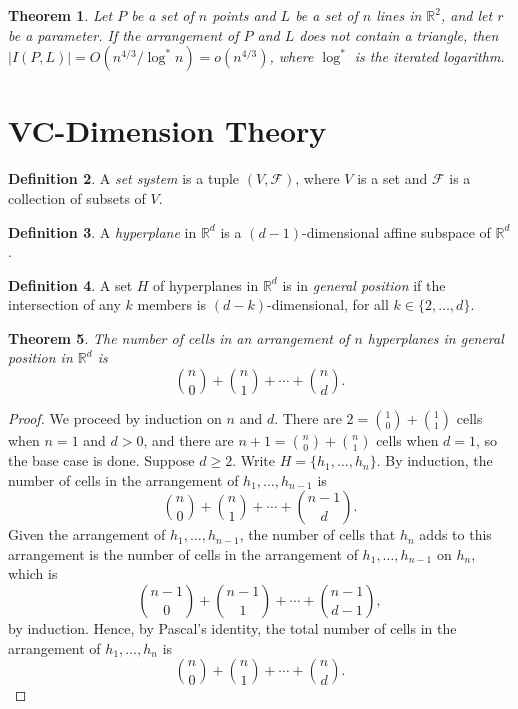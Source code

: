 \documentclass[12pt,reqno]{amsart}
\newtheorem{theorem}{Theorem}[section]
\theoremstyle{definition}
\newtheorem{definition}[theorem]{Definition}
\theoremstyle{remark}
\renewcommand{\geq}{\geqslant}
\def\F{\mathcal{F}}
\def\R{\mathbb{R}}
\numberwithin{equation}{section}
\begin{document}
\begin{theorem}
	Let $P$ be a set of $n$ points and $L$ be a set of $n$ lines in $\R^2$, and let $r$ be a parameter. If the arrangement of $P$ and $L$ does not contain a triangle, then $|I(P, L)| = O(n^{4/3}/\log^* n) = o(n^{4/3})$, where $\log^*$ is the iterated logarithm. 
\end{theorem}

\newpage

\section{VC-Dimension Theory}

\begin{definition}
	A \textit{set system} is a tuple $(V, \F)$, where $V$ is a set and $\F$ is a collection of subsets of $V$. 
\end{definition}

\begin{definition}
	A \textit{hyperplane} in $\R^d$ is a $(d - 1)$-dimensional affine subspace of $\R^d$. 
\end{definition}

\begin{definition}
	A set $H$ of hyperplanes in $\R^d$ is in \textit{general position} if the intersection of any $k$ members is $(d - k)$-dimensional, for all $k \in \{2, \ldots, d\}$.
\end{definition}

\begin{theorem}
	The number of cells in an arrangement of $n$ hyperplanes in general position in $\R^d$ is
	\[
		\binom{n}{0} + \binom{n}{1} + \cdots + \binom{n}{d}.
	\]
\end{theorem}

\begin{proof}
	We proceed by induction on $n$ and $d$. There are $2 = \binom{1}{0} + \binom{1}{1}$ cells when $n = 1$ and $d > 0$, and there are $n + 1 = \binom{n}{0} + \binom{n}{1}$ cells when $d = 1$, so the base case is done. Suppose $d \geq 2$. Write $H = \{h_1, \ldots, h_n\}$. By induction, the number of cells in the arrangement of $h_1, \ldots, h_{n - 1}$ is 
	\[
		\binom{n}{0} + \binom{n}{1} + \cdots + \binom{n - 1}{d}.
	\]
	Given the arrangement of $h_1, \ldots, h_{n - 1}$, the number of cells that $h_n$ adds to this arrangement is the number of cells in the arrangement of $h_1, \ldots, h_{n - 1}$ on $h_n$, which is
	\[
		\binom{n - 1}{0} + \binom{n - 1}{1} + \cdots + \binom{n - 1}{d - 1},
	\]
	by induction. Hence, by Pascal's identity, the total number of cells in the arrangement of $h_1, \ldots, h_n$ is
	\[
		\binom{n}{0} + \binom{n}{1} + \cdots + \binom{n}{d}.
	\]
\end{proof}
\end{document}
